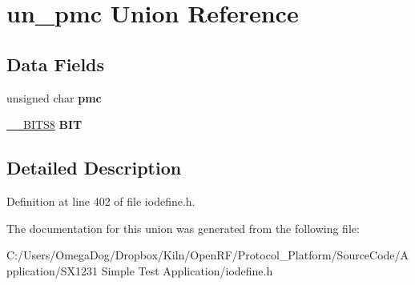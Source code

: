 \hypertarget{unionun__pmc}{\section{un\-\_\-pmc Union Reference}
\label{unionun__pmc}
}
\subsection*{Data Fields}
\begin{DoxyCompactItemize}
\item 
\hypertarget{unionun__pmc_aa99b0f9471da7c67a69a814fb1c2a8eb}{unsigned char {\bfseries pmc}}\label{unionun__pmc_aa99b0f9471da7c67a69a814fb1c2a8eb}

\item 
\hypertarget{unionun__pmc_af3ec9e516125a7eb0d3079e8338bf772}{\hyperlink{struct_____b_i_t_s8}{\-\_\-\-\_\-\-B\-I\-T\-S8} {\bfseries B\-I\-T}}\label{unionun__pmc_af3ec9e516125a7eb0d3079e8338bf772}

\end{DoxyCompactItemize}


\subsection{Detailed Description}


Definition at line 402 of file iodefine.\-h.



The documentation for this union was generated from the following file\-:\begin{DoxyCompactItemize}
\item 
C\-:/\-Users/\-Omega\-Dog/\-Dropbox/\-Kiln/\-Open\-R\-F/\-Protocol\-\_\-\-Platform/\-Source\-Code/\-Application/\-S\-X1231 Simple Test Application/iodefine.\-h\end{DoxyCompactItemize}
